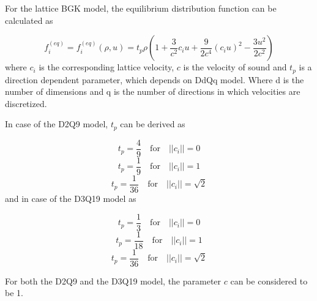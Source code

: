 For the lattice BGK model, the equilibrium distribution function can be calculated as

\begin{equation}
f_i^{(eq)} = f_i^{(eq)}(\rho, u) = t_p \rho ( 1 + \frac{3}{c^2} c_i u + \frac{9}{2c^4} (c_i u)^2 - \frac{3u^2}{2c^2})
\end{equation}
where $c_i$ is the corresponding lattice velocity, $c$ is the velocity of sound and $t_p$ is a direction dependent parameter, which depends on DdQq model. Where d is the number of dimensions and q is the number of directions in which velocities are discretized.

In case of the D2Q9 model, $t_p$ can be derived as

\begin{equation}
t_p = \frac{4}{9} \quad \textrm{for} \quad ||c_i||=0
\end{equation}
\begin{equation}
t_p = \frac{1}{9} \quad \textrm{for} \quad ||c_i||=1
\end{equation}
\begin{equation}
t_p = \frac{1}{36} \quad \textrm{for} \quad ||c_i||=\sqrt{2}
\end{equation}
and in case of the D3Q19 model as

\begin{equation}
t_p = \frac{1}{3} \quad \textrm{for} \quad ||c_i||=0
\end{equation}
\begin{equation}
t_p = \frac{1}{18} \quad \textrm{for} \quad ||c_i||=1
\end{equation}
\begin{equation}
t_p = \frac{1}{36} \quad \textrm{for} \quad ||c_i||=\sqrt{2}
\end{equation}

For both the D2Q9 and the D3Q19 model, the parameter $c$ can be considered to be 1.